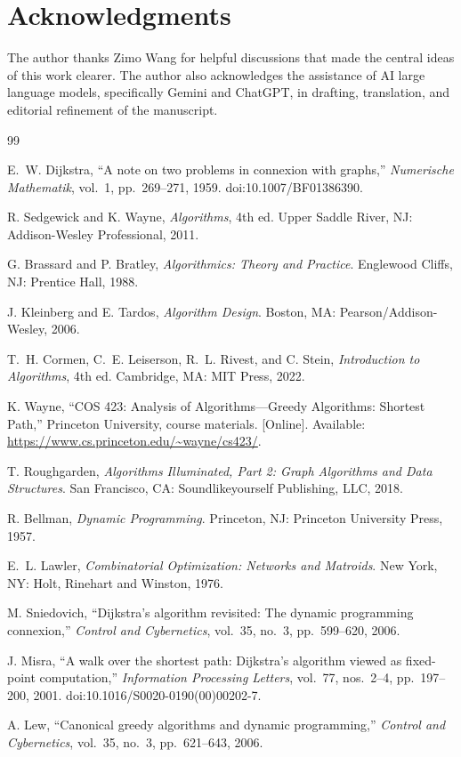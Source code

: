 \documentclass[11pt]{article}
\begin{document}
\section*{Acknowledgments}
The author thanks Zimo Wang for helpful discussions that made the central ideas of this work clearer. The author also acknowledges the assistance of AI large language models, specifically Gemini and ChatGPT, in drafting, translation, and editorial refinement of the manuscript.

\begin{thebibliography}{99}

E.~W. Dijkstra,
``A note on two problems in connexion with graphs,''
\emph{Numerische Mathematik}, vol.~1, pp.~269--271, 1959.
doi:10.1007/BF01386390.

R. Sedgewick and K. Wayne,
\emph{Algorithms}, 4th ed.
Upper Saddle River, NJ: Addison-Wesley Professional, 2011.

G. Brassard and P. Bratley,
\emph{Algorithmics: Theory and Practice}.
Englewood Cliffs, NJ: Prentice Hall, 1988.

J. Kleinberg and E. Tardos,
\emph{Algorithm Design}.
Boston, MA: Pearson/Addison-Wesley, 2006.

T.~H. Cormen, C.~E. Leiserson, R.~L. Rivest, and C. Stein,
\emph{Introduction to Algorithms}, 4th ed.
Cambridge, MA: MIT Press, 2022.

K. Wayne,
``COS 423: Analysis of Algorithms---Greedy Algorithms: Shortest Path,''
Princeton University, course materials.
[Online]. Available: \url{https://www.cs.princeton.edu/~wayne/cs423/}.

T. Roughgarden,
\emph{Algorithms Illuminated, Part 2: Graph Algorithms and Data Structures}.
San Francisco, CA: Soundlikeyourself Publishing, LLC, 2018.

R. Bellman,
\emph{Dynamic Programming}.
Princeton, NJ: Princeton University Press, 1957.

E.~L. Lawler,
\emph{Combinatorial Optimization: Networks and Matroids}.
New York, NY: Holt, Rinehart and Winston, 1976.

M. Sniedovich,
``Dijkstra's algorithm revisited: The dynamic programming connexion,''
\emph{Control and Cybernetics}, vol.~35, no.~3, pp.~599--620, 2006.

J. Misra,
``A walk over the shortest path: Dijkstra's algorithm viewed as fixed-point computation,''
\emph{Information Processing Letters}, vol.~77, nos.~2--4, pp.~197--200, 2001.
doi:10.1016/S0020-0190(00)00202-7.

A. Lew,
``Canonical greedy algorithms and dynamic programming,''
\emph{Control and Cybernetics}, vol.~35, no.~3, pp.~621--643, 2006.

\end{thebibliography}
\end{document}
